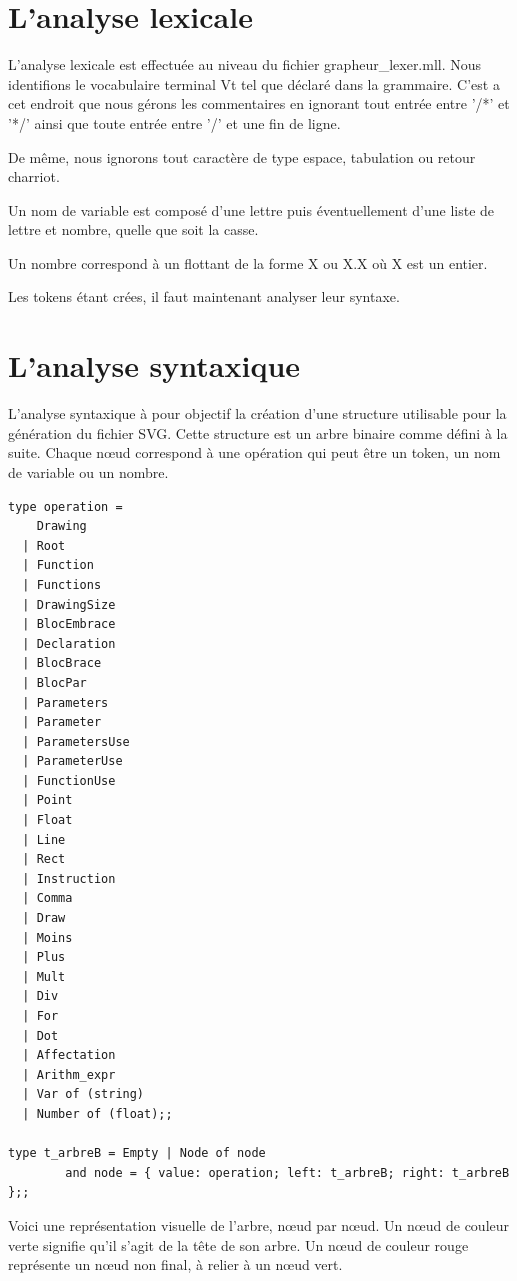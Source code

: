 \documentclass[11pt]{report} %
\begin{document}
\section{L'analyse lexicale}
	L'analyse lexicale est effectuée au niveau du fichier grapheur\_lexer.mll. Nous identifions le vocabulaire terminal Vt tel que déclaré dans la grammaire. C'est a cet endroit que nous gérons les commentaires en ignorant tout entrée entre '/*' et '*/' ainsi que toute entrée entre '/' et une fin de ligne.

De même, nous ignorons tout caractère de type espace, tabulation ou retour charriot.

Un nom de variable est composé d'une lettre puis éventuellement d'une liste de lettre et nombre, quelle que soit la casse.

Un nombre correspond à un flottant de la forme X ou X.X où X est un entier.

Les tokens étant crées, il faut maintenant analyser leur syntaxe.

\section{L'analyse syntaxique}
L'analyse syntaxique à pour objectif la création d'une structure utilisable pour la génération du fichier SVG. Cette structure est un arbre binaire comme défini à la suite. Chaque n{\oe}ud correspond à une opération qui peut être un token, un nom de variable ou un nombre.

\begin{lstlisting}[caption=Type arbre, language=caml]
type operation =
    Drawing
  | Root
  | Function
  | Functions
  | DrawingSize
  | BlocEmbrace
  | Declaration
  | BlocBrace
  | BlocPar
  | Parameters
  | Parameter
  | ParametersUse
  | ParameterUse
  | FunctionUse
  | Point
  | Float
  | Line
  | Rect
  | Instruction
  | Comma
  | Draw
  | Moins
  | Plus
  | Mult
  | Div
  | For
  | Dot
  | Affectation
  | Arithm_expr
  | Var of (string)
  | Number of (float);;
  
type t_arbreB = Empty | Node of node
        and node = { value: operation; left: t_arbreB; right: t_arbreB };;
\end{lstlisting}

Voici une représentation visuelle de l'arbre,  n{\oe}ud par  n{\oe}ud. Un n{\oe}ud de couleur verte signifie qu'il s'agit de la tête de son arbre. Un n{\oe}ud de couleur rouge représente un n{\oe}ud non final, à relier à un n{\oe}ud vert.
\end{document}
